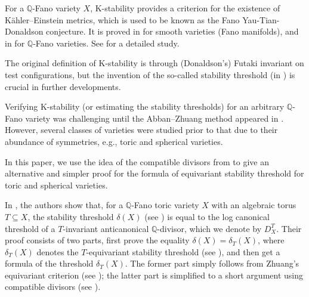 \newcommand{\ord}{\mathrm{ord}}

\newcommand{\GDValo}{\mathrm{DivVal}^{G, \circ}}
\newcommand{\cano}{\mathrm{K}}

\newcommand{\lct}{\mathrm{lct}}

For a $\mathbb{Q}$-Fano variety $X$, K-stability provides a criterion for the existence of Kähler--Einstein metrics, which is used to be known as the Fano Yau-Tian-Donaldson conjecture.
% 
It is proved in \cite{CDS_KE_Fano} for smooth varieties (Fano manifolds), and in \cite{Berman_Kps_QFano_KE, LXZ_fg_val_compu_thre} for $\mathbb{Q}$-Fano varieties. See \cite{Xu_Book} for a detailed study.

The original definition of K-stability is through (Donaldson's) Futaki invariant on test configurations, but the invention of the so-called stability threshold (in \cite{FO_Kst_Kano,BJ_thre_val_kst}) is crucial in further developments.

Verifying K-stability (or estimating the stability thresholds) for an arbitrary $\mathbb{Q}$-Fano variety was challenging until the Abban--Zhuang method appeared in \cite{AZ_Kstab_fano_flag}. However, several classes of varieties were studied prior to that due to their abundance of symmetries, e.g., toric and spherical varieties.

In this paper, we use the idea of the compatible divisors from \cite{AZ_Kstab_fano_flag} to give an alternative and simpler proof for the formula of equivariant stability threshold for toric and spherical varieties.

In \cite{BJ_thre_val_kst}, the authors show that, for a $\mathbb{Q}$-Fano toric variety $X$ with an algebraic torus $T \subseteq X$, the stability threshold $\delta(X)$ (see ) is equal to the log canonical threshold of a $T$-invariant anticanonical $\mathbb{Q}$-divisor, which we denote by $D^T_X$.
% 
Their proof consists of two parts, first prove the equality $\delta(X) = \delta_T(X)$, where $\delta_T(X)$ denotes the $T$-equivariant stability threshold (see ), and then get a formula of the threshold $\delta_T(X)$.
% 
The former part simply follows from Zhuang's equivariant criterion \cite{Zhuang_equi_Kst} (see ); the latter part is simplified to a short argument using compatible divisors (see ).


